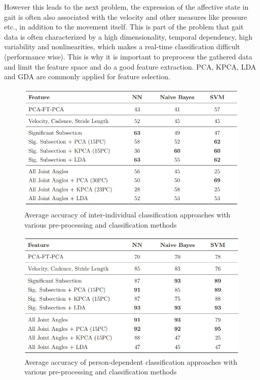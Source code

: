 \documentclass[conference]{IEEEtran}
\begin{document}
However this leads to the next problem, the expression of the affective state in gait is often also associated with the velocity\cite{crane2007motion,pollick2001perceiving,roether2009critical} and other measures like pressure etc., in addition to the movement itself. This is part of the problem that gait data is often characterized by a high dimensionality, temporal dependency, high variability and nonlinearities\cite{karg2012pattern}, which makes a real-time classification difficult (performance wise). This is why it is important to preprocess the gathered data and limit the feature space and do a good feature extraction. PCA, KPCA, LDA and GDA are commonly applied for feature selection\cite{karg2012pattern}.\

\begin{figure}[H]
\centering
\includegraphics[width=\linewidth]{interIndividualClassification.jpg}
\caption{Average accuracy of inter-individual classification approaches with various pre-processing and classification methods\cite{karg2012pattern}}
\label{fig:interIndividualClassification}
\end{figure}

\begin{figure}[H]
\centering
\includegraphics[width=\linewidth]{personDependantClassification.jpg}
\caption{Average accuracy of person-dependent classification approaches with various pre-processing and classification methods\cite{karg2012pattern}}
\label{fig:personDependantClassification}
\end{figure}
\end{document}
